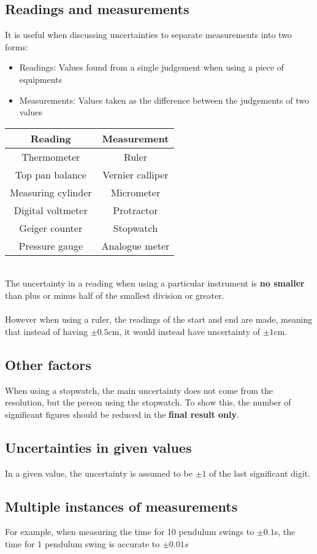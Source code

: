 \documentclass{article}[18pt]
\begin{document}
\subsection{Readings and measurements}
It is useful when discussing uncertainties to separate measurements into two forms:
\begin{itemize}
\item Readings: Values found from a single judgement when using a piece of equipments
\item Measurements: Values taken as the difference between the judgements of two values
\end{itemize}
\begin{tabular}{|c|c|}
\hline
Reading&Measurement\\
\hline
Thermometer&Ruler\\
\hline
Top pan balance&Vernier calliper\\
\hline
Measuring cylinder&Micrometer\\
\hline
Digital voltmeter&Protractor\\
\hline
Geiger counter&Stopwatch\\
\hline
Pressure gauge&Analogue meter\\
\hline
\end{tabular}
\\
The uncertainty in a reading when using a particular instrument is \textbf{no smaller} than plus or minus half of the smallest division or greater.\\
\\
However when using a ruler, the readings of the start and end are made, meaning that instead of having $\pm 0.5$cm, it would instead have uncertainty of $\pm 1$cm.
\subsection{Other factors}
When using a stopwatch, the main uncertainty does not come from the resolution, but the person using the stopwatch. To show this, the number of significant figures should be reduced in the \textbf{final result only}.
\subsection{Uncertainties in given values}
In a given value, the uncertainty is assumed to be $\pm 1$ of the last significant digit.
\subsection{Multiple instances of measurements}
For example, when measuring the time for 10 pendulum swings to $\pm 0.1$s, the time for 1 pendulum swing is accurate to $\pm 0.01s$
\end{document}
